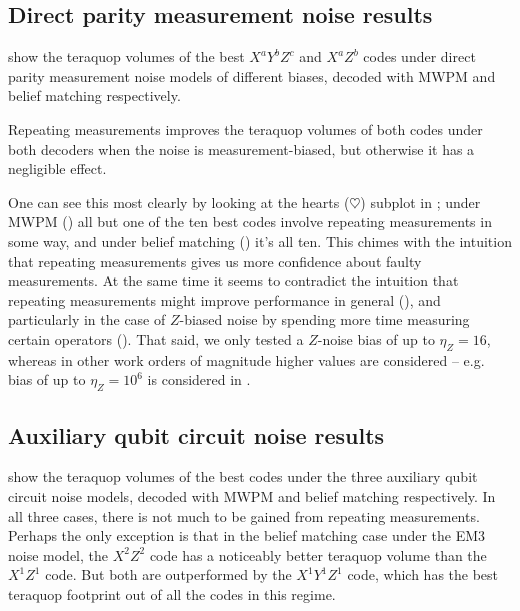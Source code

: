 \subsection{Direct parity measurement noise results}\label{subsec:repeating_measurements_direct_parity_measurement_noise}

 show the teraquop volumes of the best $X^a Y^b Z^c$ and $X^a Z^b$ codes under direct parity measurement noise models of different biases, decoded with MWPM and belief matching respectively.

\begin{keypoint}
    Repeating measurements improves the teraquop volumes of both codes under both decoders when the noise is measurement-biased, but otherwise it has a negligible effect.
\end{keypoint}

One can see this most clearly by looking at the hearts ($\heartsuit$) subplot in ;
under MWPM () all but one of the ten best codes involve repeating measurements in some way,
and under belief matching () it's all ten.
This chimes with the intuition that repeating measurements gives us more confidence about faulty measurements.
At the same time it seems to contradict the intuition that repeating measurements might improve performance in general (), and particularly in the case of $Z$-biased noise by spending more time measuring certain operators (). That said, we only tested a $Z$-noise bias of up to $\eta_Z = 16$, whereas in other work orders of magnitude higher values are considered -- e.g. bias of up to $\eta_Z = 10^6$ is considered in .

\subsection{Auxiliary qubit circuit noise results}\label{subsec:repeating_measurements_auxiliary_qubit_circuit_noise}

 show the teraquop volumes of the best codes under the three auxiliary qubit circuit noise models, decoded with MWPM and belief matching respectively.
In all three cases, there is not much to be gained from repeating measurements.
Perhaps the only exception is that in the belief matching case under the EM3 noise model, the $X^2 Z^2$ code has a noticeably better teraquop volume than the $X^1 Z^1$ code.
But both are outperformed by the $X^1 Y^1 Z^1$ code, which has the best teraquop footprint out of all the codes in this regime.

